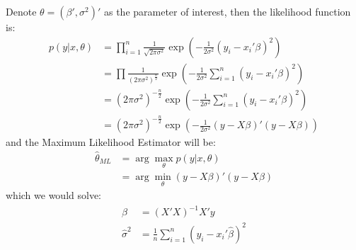 Denote $\theta = (\beta', \sigma^2)'$ as the parameter of interest,
then the likelihood function is:
\begin{align}
    p(y | x, \theta) &= \prod_{i=1}^n \frac{1}{\sqrt{2\pi \sigma^2}} \exp \left( -\frac{1}{2\sigma^2} (y_i - x_i' \beta)^2 \right) \\
    &= \prod \frac{1}{(2\pi \sigma^2)^{\frac{n}{2}}} \exp \left( -\frac{1}{2\sigma^2} \sum_{i=1}^n (y_i - x_i' \beta)^2 \right) \\
    &= (2\pi \sigma^2)^{ -\frac{n}{2}} \exp \left( -\frac{1}{2\sigma^2} \sum_{i=1}^n (y_i - x_i' \beta)^2 \right) \\
    &= (2\pi \sigma^2)^{ -\frac{n}{2}} \exp \left( -\frac{1}{2\sigma^2} (y - X\beta)'(y - X\beta) \right)
\end{align}
and the Maximum Likelihood Estimator will be:
\begin{align}
    \hat{\theta}_{ML} &= \arg \max_\theta p(y | x, \theta) \\
    &= \arg \min_\theta (y - X\beta)'(y - X\beta)
\end{align}
which we would solve:
\begin{align}
    \hat{\beta } &= (X'X)^{-1} X'y \\
    \hat{\sigma }^2 &= \frac{1}{n} \sum_{i=1}^n (y_i - x_i' \hat{\beta })^2
\end{align}

